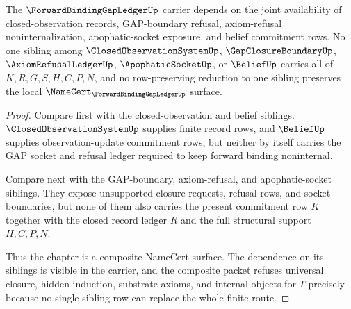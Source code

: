\begin{theorem}
\label{thm:forward-binding-gap-ledger-sibling-dependency}
The $\ForwardBindingGapLedgerUp$ carrier depends on the joint availability of closed-observation records, GAP-boundary refusal, axiom-refusal noninternalization, apophatic-socket exposure, and belief commitment rows. No one sibling among $\ClosedObservationSystemUp$, $\GapClosureBoundaryUp$, $\AxiomRefusalLedgerUp$, $\ApophaticSocketUp$, or $\BeliefUp$ carries all of $K,R,G,S,H,C,P,N$, and no row-preserving reduction to one sibling preserves the local $\NameCert_{\ForwardBindingGapLedgerUp}$ surface.
\end{theorem}
\begin{proof}
Compare first with the closed-observation and belief siblings. $\ClosedObservationSystemUp$ supplies finite record rows, and $\BeliefUp$ supplies observation-update commitment rows, but neither by itself carries the GAP socket and refusal ledger required to keep forward binding noninternal.

Compare next with the GAP-boundary, axiom-refusal, and apophatic-socket siblings. They expose unsupported closure requests, refusal rows, and socket boundaries, but none of them also carries the present commitment row $K$ together with the closed record ledger $R$ and the full structural support $H,C,P,N$.

Thus the chapter is a composite NameCert surface. The dependence on its siblings is visible in the carrier, and the composite packet refuses universal closure, hidden induction, substrate axioms, and internal objects for $T$ precisely because no single sibling row can replace the whole finite route.
\end{proof}


\begin{closurestatus}{\ForwardBindingGapLedgerUp}
  \theoryclosure{\obligationClosure}
  \formalstatus{\unformalizedV}
\end{closurestatus}
